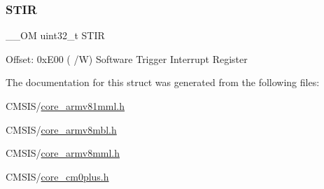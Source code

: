 \subsubsection{\texorpdfstring{STIR}{STIR}}
{\footnotesize\ttfamily \+\_\+\+\_\+\+OM uint32\+\_\+t S\+T\+IR}

Offset\+: 0x\+E00 ( /W) Software Trigger Interrupt Register 

The documentation for this struct was generated from the following files\+:\begin{DoxyCompactItemize}
\item 
C\+M\+S\+I\+S/\mbox{\hyperlink{core__armv81mml_8h}{core\+\_\+armv81mml.\+h}}\item 
C\+M\+S\+I\+S/\mbox{\hyperlink{core__armv8mbl_8h}{core\+\_\+armv8mbl.\+h}}\item 
C\+M\+S\+I\+S/\mbox{\hyperlink{core__armv8mml_8h}{core\+\_\+armv8mml.\+h}}\item 
C\+M\+S\+I\+S/\mbox{\hyperlink{core__cm0plus_8h}{core\+\_\+cm0plus.\+h}}\end{DoxyCompactItemize}
